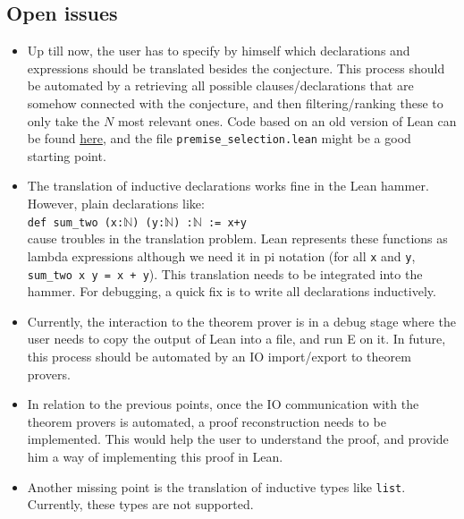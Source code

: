 \documentclass[a4paper]{article}
\begin{document}
\subsection{Open issues}
\label{sec:fol_open_issues}
\begin{itemize}
	\item Up till now, the user has to specify by himself which declarations and expressions should be translated besides the conjecture. This process should be automated by a retrieving all possible clauses/declarations that are somehow connected with the conjecture, and then filtering/ranking these to only take the $N$ most relevant ones. Code based on an old version of Lean can be found \href{https://github.com/robertylewis/relevance_filter/tree/dev_lean_reparam}{here}, and the file \texttt{premise\_selection.lean} might be a good starting point.
	\item The translation of inductive declarations works fine in the Lean hammer. However, plain declarations like:\\
	\texttt{def sum\_two (x:$\mathbb{N}$) (y:$\mathbb{N}$) :$\mathbb{N}$ := x+y}\\
	cause troubles in the translation problem. Lean represents these functions as lambda expressions although we need it in pi notation (for all \texttt{x} and \texttt{y}, \texttt{sum\_two x y = x + y}). This translation needs to be integrated into the hammer. For debugging, a quick fix is to write all declarations inductively.
	\item Currently, the interaction to the theorem prover is in a debug stage where the user needs to copy the output of Lean into a file, and run E on it. In future, this process should be automated by an IO import/export to theorem provers.
	\item In relation to the previous points, once the IO communication with the theorem provers is automated, a proof reconstruction needs to be implemented. This would help the user to understand the proof, and provide him a way of implementing this proof in Lean.
	\item Another missing point is the translation of inductive types like \texttt{list}. Currently, these types are not supported.
\end{itemize}



\newpage
\end{document}
